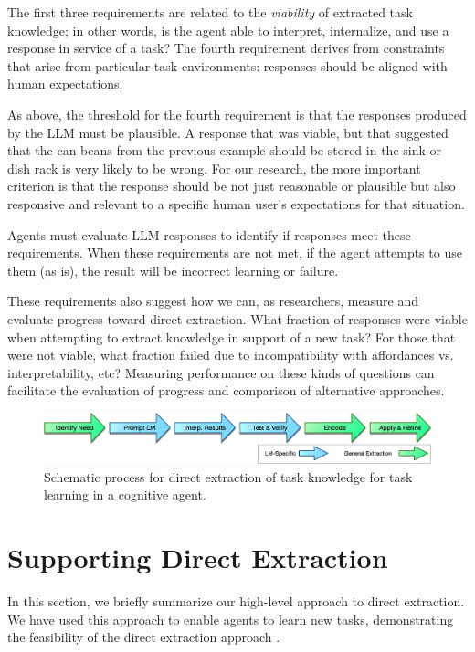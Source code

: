 \documentclass[letterpaper]{article} %
\begin{document}
The first three requirements are related to the \textit{viability} of extracted task knowledge; in other words, is the agent able to interpret, internalize, and use a response in service of a task? The fourth requirement derives from constraints that arise from particular task environments: responses should be aligned with human expectations.

As above, the threshold for the fourth requirement is that the responses produced by the LLM must be plausible. A response that was viable, but that suggested that the can beans from the previous example should be stored in the sink or dish rack is very likely to be wrong. For our research, the more important criterion is that the response should be not just reasonable or plausible but also responsive and relevant to a specific human user's expectations for that situation.


Agents must evaluate LLM responses to identify if responses meet these requirements. When these requirements are not met, if the agent attempts to use them (as is), the result will be incorrect learning or failure.

These requirements also suggest how we can, as researchers, measure and evaluate progress toward direct extraction. What fraction of responses were viable when attempting to extract knowledge in support of a new task? For those that were not viable, what fraction failed due to incompatibility with affordances vs. interpretability, etc? Measuring performance on these kinds of questions can facilitate the evaluation of progress and comparison of alternative approaches.



\begin{figure}[t]
    \centering
    \includegraphics[width=.9\columnwidth]{figures/ProcessingSteps.png}
    \caption{Schematic process for direct extraction of task knowledge for task learning in a cognitive agent.}
    \label{fig:processing-steps}
\end{figure}



\section{Supporting Direct Extraction}
In this section, we briefly summarize our high-level approach to direct extraction. We have used this approach to enable agents to learn new tasks, demonstrating the feasibility of the direct extraction approach \cite{kirk_improving_2022,kirk_improving_2023,kirk_integrating_2023}.
\end{document}
